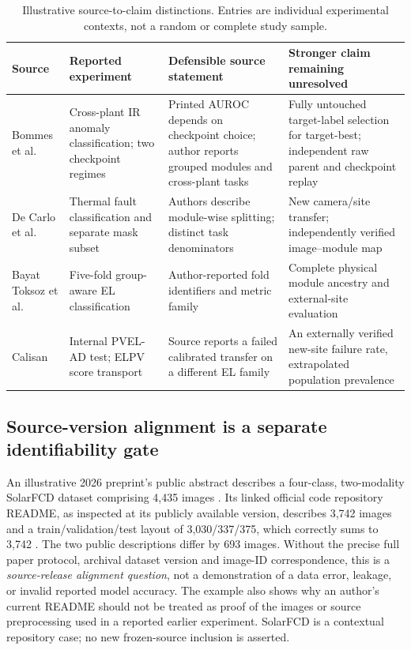 \documentclass[10pt,a4paper]{article}
\begin{document}
\begin{table}[ht]
\centering\small
\caption{Illustrative source-to-claim distinctions. Entries are individual experimental contexts, not a random or complete study sample.}
\begin{tabularx}{\linewidth}{@{}p{2cm}p{2.3cm}X X@{}}
\toprule Source & Reported experiment & Defensible source statement & Stronger claim remaining unresolved \\
\midrule Bommes et al. \cite{bommes2022} & Cross-plant IR anomaly classification; two checkpoint regimes & Printed AUROC depends on checkpoint choice; author reports grouped modules and cross-plant tasks & Fully untouched target-label selection for target-best; independent raw parent and checkpoint replay \\
De Carlo et al. \cite{decarlo2026} & Thermal fault classification and separate mask subset & Authors describe module-wise splitting; distinct task denominators & New camera/site transfer; independently verified image--module map \\
Bayat Toksoz et al. \cite{bayat2026} & Five-fold group-aware EL classification & Author-reported fold identifiers and metric family & Complete physical module ancestry and external-site evaluation \\
Calisan \cite{calisan2026} & Internal PVEL-AD test; ELPV score transport & Source reports a failed calibrated transfer on a different EL family & An externally verified new-site failure rate, extrapolated population prevalence \\
\bottomrule
\end{tabularx}
\end{table}

\subsection{Source-version alignment is a separate identifiability gate}
An illustrative 2026 preprint's public abstract describes a four-class, two-modality SolarFCD dataset comprising 4,435 images \cite{solarfcd2026}. Its linked official code repository README, as inspected at its publicly available version, describes 3,742 images and a train/validation/test layout of 3,030/337/375, which correctly sums to 3,742 \cite{solarfcdrepo}. The two public descriptions differ by 693 images. Without the precise full paper protocol, archival dataset version and image-ID correspondence, this is a \emph{source-release alignment question}, not a demonstration of a data error, leakage, or invalid reported model accuracy. The example also shows why an author's current README should not be treated as proof of the images or source preprocessing used in a reported earlier experiment. SolarFCD is a contextual repository case; no new frozen-source inclusion is asserted.
\end{document}
